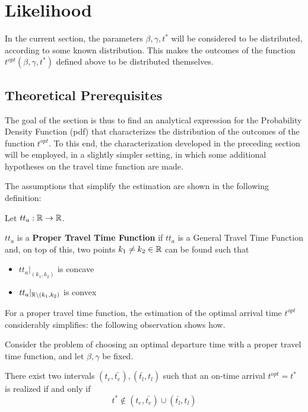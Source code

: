 \section{Likelihood}

In the current section,
the parameters \(\beta, \gamma, t^*\) will be considered to be distributed, according to some known distribution.
This makes the outcomes of the function \(t^{opt}(\beta, \gamma, t^*)\) defined above to be distributed themselves.

\subsection{Theoretical Prerequisites}


The goal of the section is thus to find an analytical expression for the Probability Density Function (pdf) that characterizes the distribution of the outcomes of the function \(t^{opt}\).
To this end, the characterization developed in the preceding section will be employed,
in a slightly simpler setting, in which some additional hypotheses on the travel time function are made.

The assumptions that simplify the estimation are shown in the following definition:
\begin{definition}
  \label{def:proper_tt}
  Let \(tt_a:\mathbb{R}\rightarrow\mathbb{R}\).

  \(tt_a\) is a \textbf{Proper Travel Time Function} if \(tt_a\) is a General Travel Time Function and,
  on top of this, 
  two points \(k_1\neq k_2 \in \mathbb{R}\) can be found such that
  \begin{itemize}
  \item \(tt_a|_{(k_1, k_2)}\) is concave
  \item \(tt_a|_{\mathbb{R}\setminus(k_1, k_2)}\) is convex
  \end{itemize}
\end{definition}

For a proper travel time function,
the estimation of the optimal arrival time \(t^{opt}\) considerably simplifies:
the following observation shows how.
\begin{obs}
  \label{obs:simplified-char}
  Consider the problem of choosing an optimal departure time
  with a proper travel time function, and let \(\beta, \gamma\) be fixed.

  There exist two intervals \((t_e, \bar{t_e}), (\bar{t_l}, t_l)\) such that an on-time arrival \(t^{opt} = t^*\) is realized if and only if
  \begin{equation*}
    t^* \notin (t_e, \bar{t_e}) \cup (\bar{t_l}, t_l)
  \end{equation*}
\end{obs}

